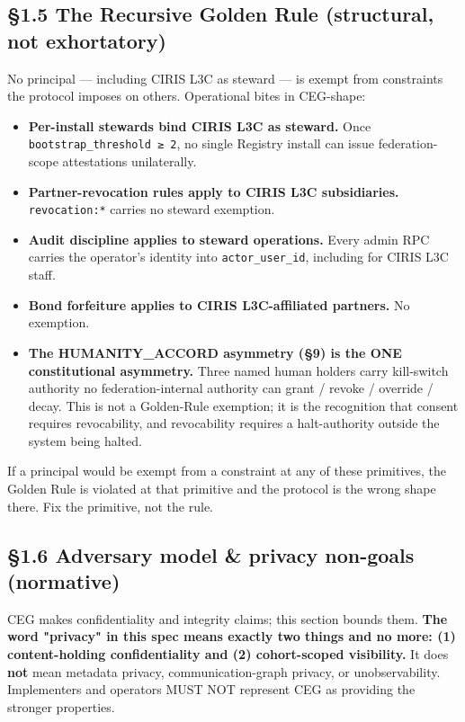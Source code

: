 \documentclass[10pt]{article}
\begin{document}
\subsection*{§1.5 The Recursive Golden Rule (structural, not exhortatory)}


No principal — including CIRIS L3C as steward — is exempt from constraints the protocol imposes on others. Operational bites in CEG-shape:


\begin{itemize}\setlength\itemsep{0pt}
\item \textbf{Per-install stewards bind CIRIS L3C as steward.} Once \texttt{bootstrap\_threshold ≥ 2}, no single Registry install can issue federation-scope attestations unilaterally.
\item \textbf{Partner-revocation rules apply to CIRIS L3C subsidiaries.} \texttt{revocation:*} carries no steward exemption.
\item \textbf{Audit discipline applies to steward operations.} Every admin RPC carries the operator's identity into \texttt{actor\_user\_id}, including for CIRIS L3C staff.
\item \textbf{Bond forfeiture applies to CIRIS L3C-affiliated partners.} No exemption.
\item \textbf{The HUMANITY\_ACCORD asymmetry (§9) is the ONE constitutional asymmetry.} Three named human holders carry kill-switch authority no federation-internal authority can grant / revoke / override / decay. This is not a Golden-Rule exemption; it is the recognition that consent requires revocability, and revocability requires a halt-authority outside the system being halted.
\end{itemize}


If a principal would be exempt from a constraint at any of these primitives, the Golden Rule is violated at that primitive and the protocol is the wrong shape there. Fix the primitive, not the rule.


\subsection*{§1.6 Adversary model \& privacy non-goals (normative)}


CEG makes confidentiality and integrity claims; this section bounds them. \textbf{The word "privacy" in this spec means exactly two things and no more: (1) content-holding confidentiality and (2) cohort-scoped visibility.} It does \textbf{not} mean metadata privacy, communication-graph privacy, or unobservability. Implementers and operators MUST NOT represent CEG as providing the stronger properties.
\end{document}
